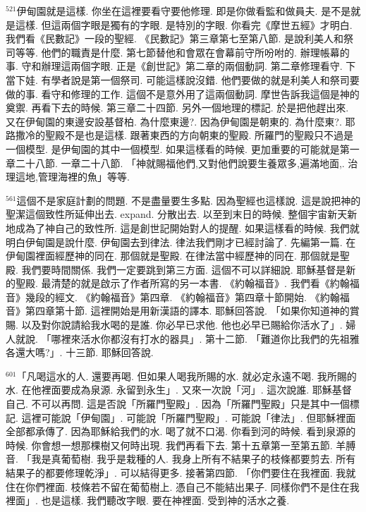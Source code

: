 \documentclass{book}
\begin{document}
$^{521}$伊甸園就是這樣.
你坐在這裡要看守要他修理.
即是你做看監和做員夫.
是不是就是這樣.
但這兩個字眼是獨有的字眼.
是特別的字眼.
你看完《摩世五經》才明白.
我們看《民數記》一段的聖經.
《民數記》第三章第七至第八節.
是說利美人和祭司等等.
他們的職責是什麼.
第七節替他和會眾在會幕前守所吩咐的.
辦理帳幕的事.
守和辦理這兩個字眼.
正是《創世記》第二章的兩個動詞.
第二章修理看守.
下當下娃.
有學者說是第一個祭司.
可能這樣說沒錯.
他們要做的就是利美人和祭司要做的事.
看守和修理的工作.
這個不是意外用了這兩個動詞.
摩世告訴我這個是神的奠禦.
再看下去的時候.
第三章二十四節.
另外一個地理的標記.
於是把他趕出來.
又在伊甸園的東邊安設基督柏.
為什麼東邊?.
因為伊甸園是朝東的.
為什麼東?.
耶路撒冷的聖殿不是也是這樣.
跟著東西的方向朝東的聖殿.
所羅門的聖殿只不過是一個模型.
是伊甸園的其中一個模型.
如果這樣看的時候.
更加重要的可能就是第一章二十八節.
一章二十八節.
「神就賜福他們,又對他們說要生養眾多,遍滿地面,.
治理這地,管理海裡的魚」等等.

$^{561}$這個不是家庭計劃的問題.
不是盡量要生多點.
因為聖經也這樣說.
這是說把神的聖潔這個致性所延伸出去.
expand.
分散出去.
以至到末日的時候.
整個宇宙新天新地成為了神自己的致性所.
這是創世記開始對人的提醒.
如果這樣看的時候.
我們就明白伊甸園是說什麼.
伊甸園去到律法.
律法我們剛才已經討論了.
先編第一篇.
在伊甸園裡面經歷神的同在.
那個就是聖殿.
在律法當中經歷神的同在.
那個就是聖殿.
我們要時間關係.
我們一定要跳到第三方面.
這個不可以詳細說.
耶穌基督是新的聖殿.
最清楚的就是啟示了作者所寫的另一本書.
《約翰福音》.
我們看《約翰福音》幾段的經文.
《約翰福音》第四章.
《約翰福音》第四章十節開始.
《約翰福音》第四章第十節.
這裡開始是用新漢語的譯本.
耶穌回答說.
「如果你知道神的賞賜.
以及對你說請給我水喝的是誰.
你必早已求他.
他也必早已賜給你活水了」.
婦人就說.
「哪裡來活水你都沒有打水的器具」.
第十二節.
「難道你比我們的先祖雅各還大嗎?」.
十三節.
耶穌回答說.

$^{601}$「凡喝這水的人.
還要再喝.
但如果人喝我所賜的水.
就必定永遠不喝.
我所賜的水.
在他裡面要成為泉源.
永留到永生」.
又來一次說「河」.
這次說誰.
耶穌基督自己.
不可以再問.
這是否說「所羅門聖殿」.
因為「所羅門聖殿」只是其中一個標記.
這裡可能說「伊甸園」.
可能說「所羅門聖殿」.
可能說「律法」.
但耶穌裡面全部都承傳了.
因為耶穌給我們的水.
喝了就不口渴.
你看到河的時候.
看到泉源的時候.
你會想一想那棵樹又何時出現.
我們再看下去.
第十五章第一至第五節.
羊膊音.
「我是真葡萄樹.
我乎是栽種的人.
我身上所有不結果子的枝條都要剪去.
所有結果子的都要修理乾淨」.
可以結得更多.
接著第四節.
「你們要住在我裡面.
我就住在你們裡面.
枝條若不留在葡萄樹上.
憑自己不能結出果子.
同樣你們不是住在我裡面」.
也是這樣.
我們聽改字眼.
要在神裡面.
受到神的活水之養.
\end{document}
